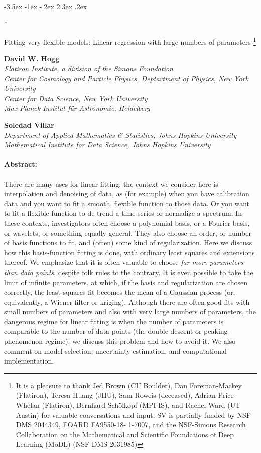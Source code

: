 \documentclass[12pt,letterpaper]{article}
\makeatletter
\renewcommand\section{\@startsection {section}{1}{\z@}%
  {-3.5ex \@plus -1ex \@minus -.2ex}%
  {2.3ex \@plus.2ex}%
  {\raggedright\normalfont\Large\bfseries}}
\makeatother
\begin{document}
\thispagestyle{plain}

\section*{\raggedright Fitting very flexible models: Linear regression with large numbers of parameters%
\footnote{%
It is a pleasure to thank
Jed Brown (CU Boulder),
Dan Foreman-Mackey (Flatiron),
Teresa Huang (JHU),
Sam Roweis (deceased),
Adrian Price-Whelan (Flatiron),
Bernhard Sch\"olkopf (MPI-IS), and
Rachel Ward (UT Austin)
for valuable conversations and input.
SV is partially funded by NSF DMS 2044349, EOARD FA9550-18-
1-7007, and the NSF-Simons Research Collaboration on the Mathematical and Scientific
Foundations of Deep Learning (MoDL) (NSF DMS 2031985)}}

\noindent
\textbf{David W. Hogg} \\
\textsl{\footnotesize Flatiron Institute, a division of the Simons Foundation \\
Center for Cosmology and Particle Physics, Deptartment of Physics, New York University \\
Center for Data Science, New York University \\
Max-Planck-Institut f\"ur Astronomie, Heidelberg}

\medskip
\noindent
\textbf{Soledad Villar} \\
\textsl{\footnotesize Department of Applied Mathematics \& Statistics, Johns Hopkins University \\
Mathematical Institute for Data Science, Johns Hopkins University}

\paragraph{Abstract:} There are many uses for linear fitting; the context we consider here is interpolation and denoising of data, as (for example) when you have calibration data and you want to fit a smooth, flexible function to those data.
Or you want to fit a flexible function to de-trend a time series or normalize a spectrum.
In these contexts, investigators often choose a polynomial basis, or a Fourier basis, or wavelets, or something equally general.
They also choose an order, or number of basis functions to fit, and (often) some kind of regularization.
Here we discuss how this basis-function fitting is done, with ordinary least squares and extensions thereof.
We emphasize that it is often valuable to choose \emph{far more parameters than data points}, despite folk rules to the contrary.
It is even possible to take the limit of infinite parameters, at which, if the basis and regularization are chosen correctly, the least-squares fit becomes the mean of a Gaussian process (or, equivalently, a Wiener filter or kriging).
Although there are often good fits with small numbers of parameters and also with very large numbers of parameters, the dangerous regime for linear fitting is when the number of parameters is comparable to the number of data points (the double-descent or peaking-phenomenon regime); we discuss this problem and how to avoid it.
We also comment on model selection, uncertainty estimation, and computational implementation.
\end{document}
